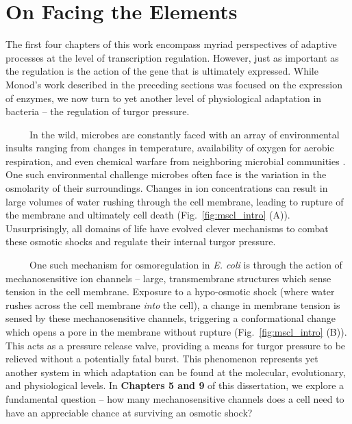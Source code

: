 \documentclass[12pt]{caltech_thesis}
\begin{document}
\hypertarget{on-facing-the-elements}{%
\section{On Facing the Elements}\label{on-facing-the-elements}}

The first four chapters of this work encompass myriad perspectives of
adaptive processes at the level of transcription regulation. However,
just as important as the regulation is the action of the gene that is
ultimately expressed. While Monod's work described in the preceding
sections was focused on the expression of enzymes, we now turn to yet
another level of physiological adaptation in bacteria -- the regulation
of turgor pressure.

~~~~~In the wild, microbes are constantly faced with an array of
environmental insults ranging from changes in temperature, availability
of oxygen for aerobic respiration, and even chemical warfare from
neighboring microbial communities \autocite{czaran2002}. One such
environmental challenge microbes often face is the variation in the
osmolarity of their surroundings. Changes in ion concentrations can
result in large volumes of water rushing through the cell membrane,
leading to rupture of the membrane and ultimately cell death
(Fig.~\ref{fig:mscl_intro} (A)). Unsurprisingly, all domains of life
have evolved clever mechanisms to combat these osmotic shocks and
regulate their internal turgor pressure.

~~~~~One such mechanism for osmoregulation in \emph{E. coli} is through
the action of mechanosensitive ion channels -- large, transmembrane
structures which sense tension in the cell membrane. Exposure to a
hypo-osmotic shock (where water rushes across the cell membrane
\emph{into} the cell), a change in membrane tension is sensed by these
mechanosensitive channels, triggering a conformational change which
opens a pore in the membrane without rupture (Fig.~\ref{fig:mscl_intro}
(B)). This acts as a pressure release valve, providing a means for
turgor pressure to be relieved without a potentially fatal burst. This
phenomenon represents yet another system in which adaptation can be
found at the molecular, evolutionary, and physiological levels. In
\textbf{Chapters 5 and 9} of this dissertation, we explore a fundamental
question -- how many mechanosensitive channels does a cell need to have
an appreciable chance at surviving an osmotic shock?
\end{document}
